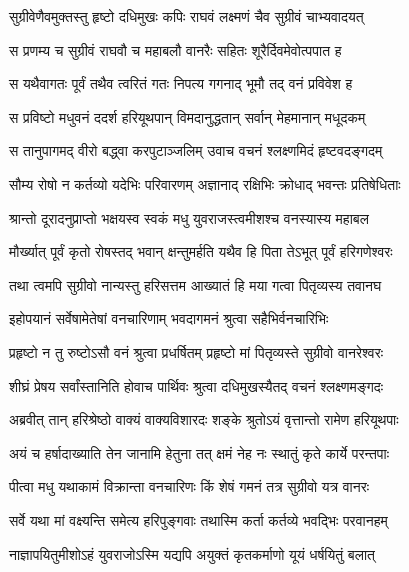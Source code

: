 
\twolineshloka
{सुग्रीवेणैवमुक्तस्तु हृष्टो दधिमुखः कपिः}
{राघवं लक्ष्मणं चैव सुग्रीवं चाभ्यवादयत्} %

\twolineshloka
{स प्रणम्य च सुग्रीवं राघवौ च महाबलौ}
{वानरैः सहितः शूरैर्दिवमेवोत्पपात ह} %

\twolineshloka
{स यथैवागतः पूर्वं तथैव त्वरितं गतः}
{निपत्य गगनाद् भूमौ तद् वनं प्रविवेश ह} %

\twolineshloka
{स प्रविष्टो मधुवनं ददर्श हरियूथपान्}
{विमदानुद्धतान् सर्वान् मेहमानान् मधूदकम्} %

\twolineshloka
{स तानुपागमद् वीरो बद्ध्वा करपुटाञ्जलिम्}
{उवाच वचनं श्लक्ष्णमिदं हृष्टवदङ्गदम्} %

\twolineshloka
{सौम्य रोषो न कर्तव्यो यदेभिः परिवारणम्}
{अज्ञानाद् रक्षिभिः क्रोधाद् भवन्तः प्रतिषेधिताः} %

\twolineshloka
{श्रान्तो दूरादनुप्राप्तो भक्षयस्व स्वकं मधु}
{युवराजस्त्वमीशश्च वनस्यास्य महाबल} %

\twolineshloka
{मौर्ख्यात् पूर्वं कृतो रोषस्तद् भवान् क्षन्तुमर्हति}
{यथैव हि पिता तेऽभूत् पूर्वं हरिगणेश्वरः} %

\twolineshloka
{तथा त्वमपि सुग्रीवो नान्यस्तु हरिसत्तम}
{आख्यातं हि मया गत्वा पितृव्यस्य तवानघ} %

\twolineshloka
{इहोपयानं सर्वेषामेतेषां वनचारिणाम्}
{भवदागमनं श्रुत्वा सहैभिर्वनचारिभिः} %

\twolineshloka
{प्रहृष्टो न तु रुष्टोऽसौ वनं श्रुत्वा प्रधर्षितम्}
{प्रहृष्टो मां पितृव्यस्ते सुग्रीवो वानरेश्वरः} %

\twolineshloka
{शीघ्रं प्रेषय सर्वांस्तानिति होवाच पार्थिवः}
{श्रुत्वा दधिमुखस्यैतद् वचनं श्लक्ष्णमङ्गदः} %

\twolineshloka
{अब्रवीत् तान् हरिश्रेष्ठो वाक्यं वाक्यविशारदः}
{शङ्के श्रुतोऽयं वृत्तान्तो रामेण हरियूथपाः} %

\twolineshloka
{अयं च हर्षादाख्याति तेन जानामि हेतुना}
{तत् क्षमं नेह नः स्थातुं कृते कार्ये परन्तपाः} %

\twolineshloka
{पीत्वा मधु यथाकामं विक्रान्ता वनचारिणः}
{किं शेषं गमनं तत्र सुग्रीवो यत्र वानरः} %

\twolineshloka
{सर्वे यथा मां वक्ष्यन्ति समेत्य हरिपुङ्गवाः}
{तथास्मि कर्ता कर्तव्ये भवद्भिः परवानहम्} %

\twolineshloka
{नाज्ञापयितुमीशोऽहं युवराजोऽस्मि यद्यपि}
{अयुक्तं कृतकर्माणो यूयं धर्षयितुं बलात्} %

